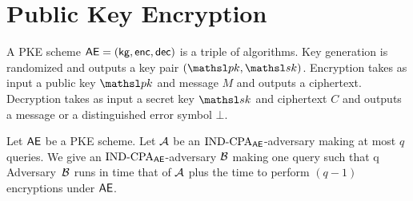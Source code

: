 \section{Public Key Encryption}
\label{sec:pke}

A PKE scheme $\textsf{AE} = ({\sf kg},{\sf enc},{\sf dec})$ is a triple of
algorithms. Key generation is randomized and outputs a key pair $(\pk,\sk)$.
Encryption
takes as input a public key $\pk$ and message $M$ and outputs a ciphertext.
Decryption takes as input a secret key $\sk$ and ciphertext $C$ and outputs a
message or a distinguished error symbol $\bot$. 





\begin{theorem*}
Let $\textsf{AE}$ be a PKE scheme. Let ${\mathcal A}$ be an $\textnormal{IND-CPA}_{\textsf{AE}}$-adversary making at
most $q$ queries. We give an $\textnormal{IND-CPA}_{\textsf{AE}}$-adversary ${\mathcal B}$ making one query
such that
\bnm
  \AdvINDCPA{\AEnc}{\advA} \le q\cdotsm\AdvINDCPA{\AEnc}{\advB}
\enm
Adversary~${\mathcal B}$ runs in time that of ${\mathcal A}$ plus the time to perform $(q-1)$
encryptions under $\textsf{AE}$.
\end{theorem*}





